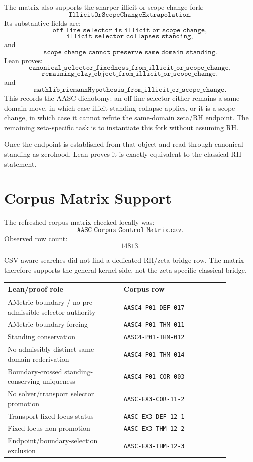 \documentclass[11pt]{article}
\begin{document}
The matrix also supports the sharper illicit-or-scope-change fork:
\[
\texttt{IllicitOrScopeChangeExtrapolation}.
\]
Its substantive fields are:
\[
\texttt{off\_line\_selector\_is\_illicit\_or\_scope\_change},
\]
\[
\texttt{illicit\_selector\_collapses\_standing},
\]
and
\[
\texttt{scope\_change\_cannot\_preserve\_same\_domain\_standing}.
\]
Lean proves:
\[
\texttt{canonical\_selector\_fixedness\_from\_illicit\_or\_scope\_change},
\]
\[
\texttt{remaining\_clay\_object\_from\_illicit\_or\_scope\_change},
\]
and
\[
\texttt{mathlib\_riemannHypothesis\_from\_illicit\_or\_scope\_change}.
\]
This records the AASC dichotomy: an off-line selector either remains a
same-domain move, in which case illicit-standing collapse applies, or it is a
scope change, in which case it cannot refute the same-domain zeta/RH endpoint.
The remaining zeta-specific task is to instantiate this fork without assuming
RH.

Once the endpoint is established from that object and read through canonical
standing-as-zerohood, Lean proves it is exactly equivalent to the classical RH
statement.

\section{Corpus Matrix Support}

The refreshed corpus matrix checked locally was:
\[
\texttt{AASC\_Corpus\_Control\_Matrix.csv}.
\]
Observed row count:
\[
14813.
\]

CSV-aware searches did not find a dedicated RH/zeta bridge row.  The matrix
therefore supports the general kernel side, not the zeta-specific classical
bridge.

\begin{center}
\begin{tabular}{p{0.46\linewidth}p{0.42\linewidth}}
\toprule
Lean/proof role & Corpus row \\
\midrule
AMetric boundary / no pre-admissible selector authority
  & \texttt{AASC4-P01-DEF-017} \\
AMetric boundary forcing
  & \texttt{AASC4-P01-THM-011} \\
Standing conservation
  & \texttt{AASC4-P01-THM-012} \\
No admissibly distinct same-domain rederivation
  & \texttt{AASC4-P01-THM-014} \\
Boundary-crossed standing-conserving uniqueness
  & \texttt{AASC4-P01-COR-003} \\
No solver/transport selector promotion
  & \texttt{AASC-EX3-COR-11-2} \\
Transport fixed locus status
  & \texttt{AASC-EX3-DEF-12-1} \\
Fixed-locus non-promotion
  & \texttt{AASC-EX3-THM-12-2} \\
Endpoint/boundary-selection exclusion
  & \texttt{AASC-EX3-THM-12-3} \\
\bottomrule
\end{tabular}
\end{center}
\end{document}
